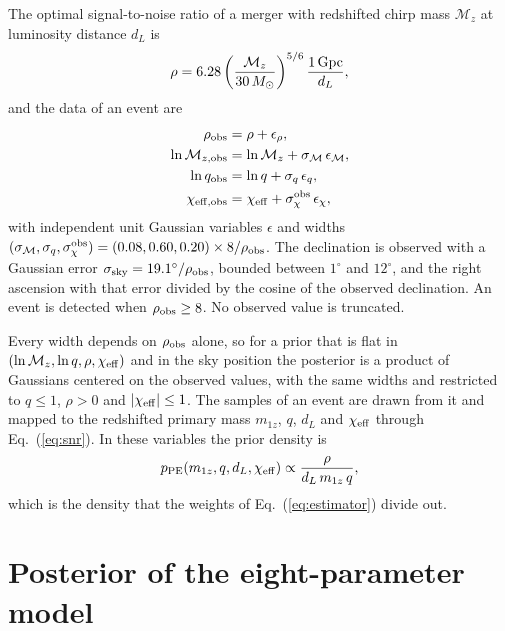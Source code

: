 \documentclass[aps,prd,reprint,twocolumn,superscriptaddress,nofootinbib,floatfix]{revtex4-2}
\newcommand{\msun}{\,M_\odot}
\newcommand{\chieff}{\chi_{\rm eff}}
\newcommand{\req}[1]{#1}
\providecommand{\MockRhoRef}{\req{6.28}}
\providecommand{\MockMcRef}{\req{30}}
\providecommand{\MockSkyCoeff}{\req{19.1}}
\providecommand{\MockSkyClipLo}{\req{1}}
\providecommand{\MockSkyClipHi}{\req{12}}
\begin{document}
The optimal signal-to-noise ratio of a merger with redshifted chirp mass
$\mathcal{M}_z$ at luminosity distance $d_L$ is
\begin{equation}
\rho=\MockRhoRef\left(\frac{\mathcal{M}_z}{\MockMcRef\msun}\right)^{5/6}
\frac{1\,{\rm Gpc}}{d_L} ,
\label{eq:snr}
\end{equation}
and the data of an event are
\begin{equation}
\begin{split}
\rho_{\rm obs}&=\rho+\epsilon_\rho ,\\
\ln\mathcal{M}_{z,{\rm obs}}&=\ln\mathcal{M}_z+\sigma_{\mathcal{M}}\,\epsilon_{\mathcal{M}} ,\\
\ln q_{\rm obs}&=\ln q+\sigma_q\,\epsilon_q ,\\
\chi_{\rm eff,obs}&=\chieff+\sigma_\chi^{\rm obs}\,\epsilon_\chi ,
\end{split}
\label{eq:data}
\end{equation}
with independent unit Gaussian variables $\epsilon$ and widths
$(\sigma_{\mathcal{M}},\sigma_q,\sigma_\chi^{\rm obs})=
(0.08,0.60,0.20)\times8/\rho_{\rm obs}$. The
declination is observed with a Gaussian error $\sigma_{\rm
sky}=\MockSkyCoeff^\circ/\rho_{\rm obs}$, bounded between
$\MockSkyClipLo^\circ$ and $\MockSkyClipHi^\circ$, and the right ascension
with that error divided by the cosine of the observed declination. An event is detected when
$\rho_{\rm obs}\geq8$. No observed value is truncated.

Every width depends on $\rho_{\rm obs}$ alone, so for a prior that is flat
in $(\ln\mathcal{M}_z,\ln q,\rho,\chieff)$ and in the sky position the
posterior is a product of Gaussians centered on the observed values, with
the same widths and restricted to $q\leq1$, $\rho>0$ and $|\chieff|\leq1$.
The \MockNsamp{} samples of an event are drawn from it and mapped to the
redshifted primary mass $m_{1z}$, $q$, $d_L$ and $\chieff$ through
Eq.~(\ref{eq:snr}). In these variables the prior density is
\begin{equation}
p_{\rm PE}(m_{1z},q,d_L,\chieff)\propto\frac{\rho}{d_L\,m_{1z}\,q} ,
\label{eq:ppe}
\end{equation}
which is the density that the weights of Eq.~(\ref{eq:estimator}) divide
out.

\section{Posterior of the eight-parameter model}
\label{app:corner}
\end{document}
